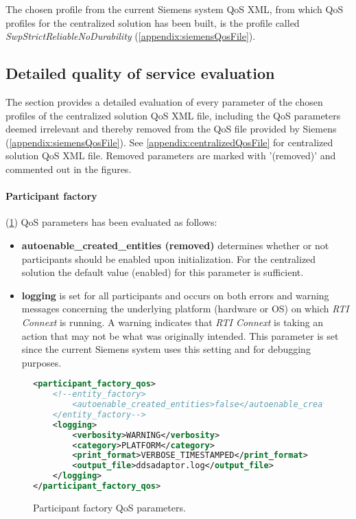 The chosen profile from the current Siemens system QoS XML, from which QoS profiles for the centralized solution has been built, is the profile called \textit{SwpStrictReliableNoDurability} (\cref{appendix:siemensQosFile}).


\subsection{Detailed quality of service evaluation} \label{sec:detailedQoSDesc}

The section provides a detailed evaluation of every parameter of the chosen profiles of the centralized solution QoS XML file, including the QoS parameters deemed irrelevant and thereby removed from the QoS file provided by Siemens (\cref{appendix:siemensQosFile}). See \cref{appendix:centralizedQosFile} for centralized solution QoS XML file. Removed parameters are marked with '(removed)' and commented out in the figures.

\paragraph{Participant factory} (\cref{fig:parFacQos}) QoS parameters has been evaluated as follows:

\begin{itemize}
	\item \textbf{autoenable\_created\_entities (removed)} determines whether or not participants should be enabled upon initialization. For the centralized solution the default value (enabled) for this parameter is sufficient.
	\item \textbf{logging} is set for all participants and occurs on both errors and warning messages concerning the underlying platform (hardware or OS) on which \textit{RTI Connext} is running. A warning indicates that \textit{RTI Connext} is taking an action that may not be what was originally intended. This parameter is set since the current Siemens system uses this setting and for debugging purposes.
\end{itemize}

\begin{figure}
\begin{lstlisting}[language=XML]
<participant_factory_qos>
	<!--entity_factory>
		<autoenable_created_entities>false</autoenable_created_entities>
	</entity_factory-->
	<logging>
		<verbosity>WARNING</verbosity>
		<category>PLATFORM</category>
		<print_format>VERBOSE_TIMESTAMPED</print_format>
		<output_file>ddsadaptor.log</output_file>
	</logging>
</participant_factory_qos>
\end{lstlisting}
\caption[Participant factory QoS parameters]{
		\label{fig:parFacQos} 
		\footnotesize{Participant factory QoS parameters.}
	}
\end{figure}

